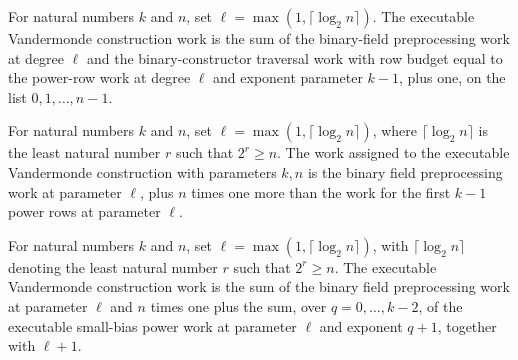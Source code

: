 \begin{definition}
\label{FABL.executableVandermondeConstructionWork}
\leanok
{}
For natural numbers $k$ and $n$, set $\ell=\max(1,\lceil\log_2 n\rceil)$. The executable
Vandermonde construction work is the sum of the binary-field preprocessing work at
degree $\ell$ and the binary-constructor traversal work with row budget equal to the
power-row work at degree $\ell$ and exponent parameter $k-1$, plus one, on the list
$0,1,\ldots,n-1$.
\end{definition}

\begin{theorem}
\label{FABL.executableVandermondeConstructionWork_eq}
\leanok
{}
For natural numbers $k$ and $n$, set $\ell=\max(1,\lceil\log_2 n\rceil)$, where
$\lceil\log_2 n\rceil$ is the least natural number $r$ such that $2^r\ge n$. The work
assigned to the executable Vandermonde construction with parameters $k,n$ is the binary
field preprocessing work at parameter $\ell$, plus $n$ times one more than the work for
the first $k-1$ power rows at parameter $\ell$.
\end{theorem}

\begin{theorem}
\label{FABL.executableVandermondeConstructionWork_eq_sum}
\leanok
{}
For natural numbers $k$ and $n$, set $\ell=\max(1,\lceil\log_2 n\rceil)$, with
$\lceil\log_2 n\rceil$ denoting the least natural number $r$ such that $2^r\ge n$. The
executable Vandermonde construction work is the sum of the binary field preprocessing
work at parameter $\ell$ and $n$ times one plus the sum, over $q=0,\ldots,k-2$, of the
executable small-bias power work at parameter $\ell$ and exponent $q+1$, together with
$\ell+1$.
\end{theorem}

